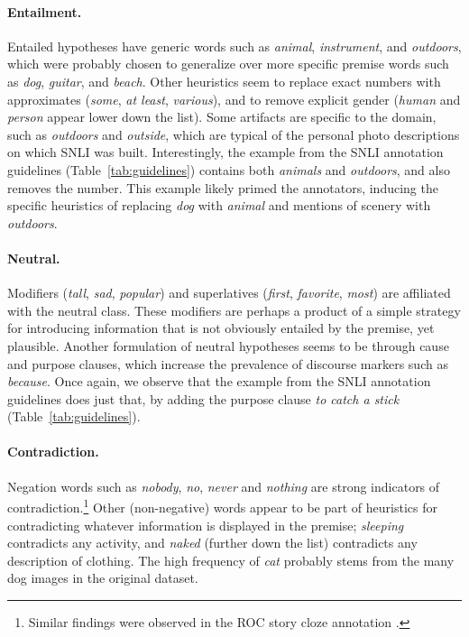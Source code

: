 \paragraph{Entailment.}
Entailed hypotheses have generic words such as \textit{animal}, \textit{instrument}, and \textit{outdoors}, which were probably chosen to generalize over more specific premise words such as \textit{dog}, \textit{guitar}, and \textit{beach}.
Other heuristics seem to replace exact numbers with approximates (\textit{some}, \textit{at least}, \textit{various}), and to remove explicit gender (\textit{human} and \textit{person} appear lower down the list). Some artifacts are specific to the domain, such as \textit{outdoors} and \textit{outside}, which are typical of the personal photo descriptions on which SNLI was built. Interestingly, the example from the SNLI annotation guidelines (Table~\ref{tab:guidelines}) contains both \textit{animals} and \textit{outdoors}, and also removes the number. This example likely primed the annotators, inducing the specific heuristics of replacing \textit{dog} with \textit{animal} and mentions of scenery with \textit{outdoors}.

\paragraph{Neutral.}
Modifiers (\textit{tall}, \textit{sad}, \textit{popular}) and superlatives (\textit{first}, \textit{favorite}, \textit{most}) are affiliated with the neutral class. These modifiers are perhaps a product of a simple strategy for introducing information that is not obviously entailed by the premise, yet plausible. Another formulation of neutral hypotheses seems to be through cause and purpose clauses, which increase the prevalence of discourse markers such as \textit{because}. 
Once again, we observe that the example from the SNLI annotation guidelines does just that, by adding the purpose clause \textit{to catch a stick} (Table~\ref{tab:guidelines}).

\paragraph{Contradiction.}
Negation words such as \textit{nobody}, \textit{no}, \textit{never} and \textit{nothing} 
are strong indicators of contradiction.\footnote{Similar findings were observed in the ROC story cloze annotation \cite{Schwartz:2017}.} Other (non-negative) words appear to be part of heuristics for contradicting whatever information is displayed in the premise; \textit{sleeping} contradicts any activity, and \textit{naked} (further down the list) contradicts any description of clothing. The high frequency of \textit{cat} probably stems from the many dog images in the original dataset. 


